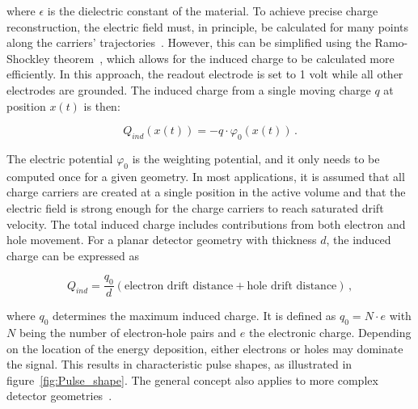 \noindent where $\epsilon$ is the dielectric constant of the material. To achieve precise charge reconstruction, the electric field must, in principle, be calculated for many points along the carriers' trajectories~\cite{he_review_2001}. 
However, this can be simplified using the Ramo-Shockley theorem~\cite{ramo_currents_1939, shockley_currents_1938}, which allows for the induced charge to be calculated more efficiently. In this approach, the readout electrode is set to 1 volt while all other electrodes are grounded. The induced charge from a single moving charge $q$ at position $x(t)$ is then: 

\begin{equation}
\label{eq:Shockley_ramo_theorem}
	Q_{ind}(x(t)) = -q \cdot \varphi_0{(x(t))} \,.
\end{equation}

The electric potential $\varphi_0$ is the weighting potential, and it only needs to be computed once for a given geometry. 
In most applications, it is assumed that all charge carriers are created at a single position in the active volume and that the electric field is strong enough for the charge carriers to reach saturated drift velocity. 
The total induced charge includes contributions from both electron and hole movement. For a planar detector geometry with thickness $d$, the induced charge can be expressed as

\begin{equation}
\label{}
	Q_{ind} = \frac{q_0}{d} \left( \text{electron drift distance} + \text{hole drift distance} \right) \,,
\end{equation}

\noindent where $q_0$ determines the maximum induced charge. It is defined as $q_0 =  N \cdot e$ with $N$ being the number of electron-hole pairs and $e$ the electronic charge. 
Depending on the location of the energy deposition, either electrons or holes may dominate the signal. This results in characteristic pulse shapes, as illustrated in figure~\ref{fig:Pulse_shape}. The general concept also applies to more complex detector geometries~\cite{knoll_radiation_2000}.  


